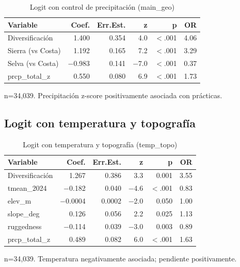 \documentclass[11pt,a4paper]{article}
\begin{document}
\begin{table}[H]
\centering
\caption{Logit con control de precipitación (main\_geo)}
\label{tab:logit_geo}
\begin{threeparttable}
\small
\begin{tabular}{lrrrrr}
\toprule
\textbf{Variable} & \textbf{Coef.} & \textbf{Err.Est.} & \textbf{z} & \textbf{p} & \textbf{OR} \\
\midrule
Diversificación & 1.400 & 0.354 & 4.0 & $<$.001 & 4.06 \\
Sierra (vs Costa) & 1.192 & 0.165 & 7.2 & $<$.001 & 3.29 \\
Selva (vs Costa) & $-$0.983 & 0.141 & $-$7.0 & $<$.001 & 0.37 \\
prcp\_total\_z & 0.550 & 0.080 & 6.9 & $<$.001 & 1.73 \\
\bottomrule
\end{tabular}
\begin{tablenotes}
\footnotesize
\item n=34,039. Precipitación z-score positivamente asociada con prácticas.
\end{tablenotes}
\end{threeparttable}
\end{table}

\subsection{Logit con temperatura y topografía}

\begin{table}[H]
\centering
\caption{Logit con temperatura y topografía (temp\_topo)}
\label{tab:logit_temp_topo}
\begin{threeparttable}
\small
\begin{tabular}{lrrrrr}
\toprule
\textbf{Variable} & \textbf{Coef.} & \textbf{Err.Est.} & \textbf{z} & \textbf{p} & \textbf{OR} \\
\midrule
Diversificación & 1.267 & 0.386 & 3.3 & 0.001 & 3.55 \\
tmean\_2024 & $-$0.182 & 0.040 & $-$4.6 & $<$.001 & 0.83 \\
elev\_m & $-$0.0004 & 0.0002 & $-$2.0 & 0.050 & 1.00 \\
slope\_deg & 0.126 & 0.056 & 2.2 & 0.025 & 1.13 \\
ruggedness & $-$0.114 & 0.039 & $-$3.0 & 0.003 & 0.89 \\
prcp\_total\_z & 0.489 & 0.082 & 6.0 & $<$.001 & 1.63 \\
\bottomrule
\end{tabular}
\begin{tablenotes}
\footnotesize
\item n=34,039. Temperatura negativamente asociada; pendiente positivamente.
\end{tablenotes}
\end{threeparttable}
\end{table}
\end{document}
